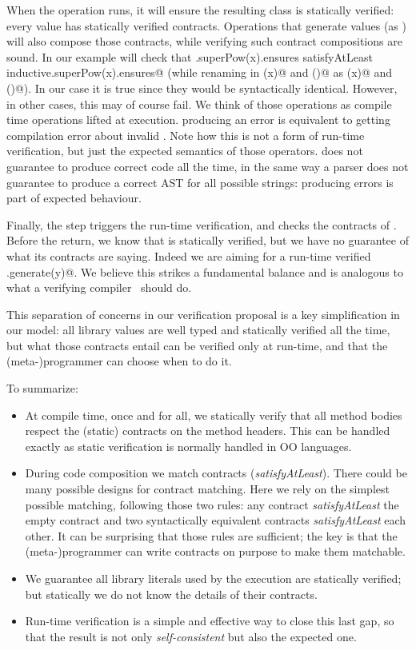 \noindent
When the \Q@Override@ operation  runs, it will
ensure the resulting class is statically verified:
every \Q@Library@ value has statically verified contracts. Operations 
that generate \Q@Library@ values (as \Q@Override@) will also compose those contracts, while verifying such
contract compositions are sound.
In our example
\Q@Override@ will check that 
\Q@res.superPow(x).ensures  satisfyAtLeast inductive.superPow(x).ensures@
(while renaming in \Q@res@ \Q@pow(x)@ and \Q@exp()@ as \Q@superPow(x)@ and \Q@superExp()@).
In our case it is true since they would be syntactically identical.
However, in other cases, this may of course fail.
We think of those operations as compile time operations lifted at execution.
\Q@Override@ producing an error is  equivalent to
getting compilation error about invalid \Q@extends@.
Note how this is not a form of run-time verification, but just the expected semantics of those operators.
\Q@Override@ does not guarantee to produce correct code all the time, in the same way a parser does not guarantee to produce a correct AST for all possible strings: producing errors is part of \Q@Override@ expected behaviour.

Finally, the \Q@return@ step triggers the run-time verification, and
checks the contracts of \Q@res@.
Before the return, we know that \Q@res@ is statically verified,
 but we have no guarantee of what its contracts are saying.
Indeed we are aiming for a run-time verified \Q@Pow.generate(y)@.
We believe this strikes a fundamental balance and is analogous to what a
verifying compiler~\cite{hoare2003verifying} should do.

This separation of concerns in our verification proposal is a key simplification
in our model:
all library values are well typed and statically verified all the time,
but what those contracts entail can be verified only at run-time, and
that the (meta-)programmer can choose when to do it.



\noindent
To summarize:
\begin{itemize}
\item
At compile time, once and for all, we statically verify that all
method bodies respect the (static) contracts on the method headers.
This can be handled exactly as static verification is normally handled in OO languages.
\item
During code composition we match contracts (\emph{satisfyAtLeast}).
There could be many possible designs for contract matching.
Here we rely on the simplest possible matching, following those two rules:
any contract \emph{satisfyAtLeast} the empty contract
and two syntactically equivalent contracts \emph{satisfyAtLeast} each other.
It can be surprising that those rules are sufficient;
the key is that 
the (meta-)programmer can write contracts
on purpose to make them matchable.
\item
We guarantee all library literals used by the execution are statically verified; but
statically we do not know the details of their contracts.
\item
Run-time verification is a simple and effective way to close this last gap, so that the result is not only \emph{self-consistent} but also the expected one.
\end{itemize}


